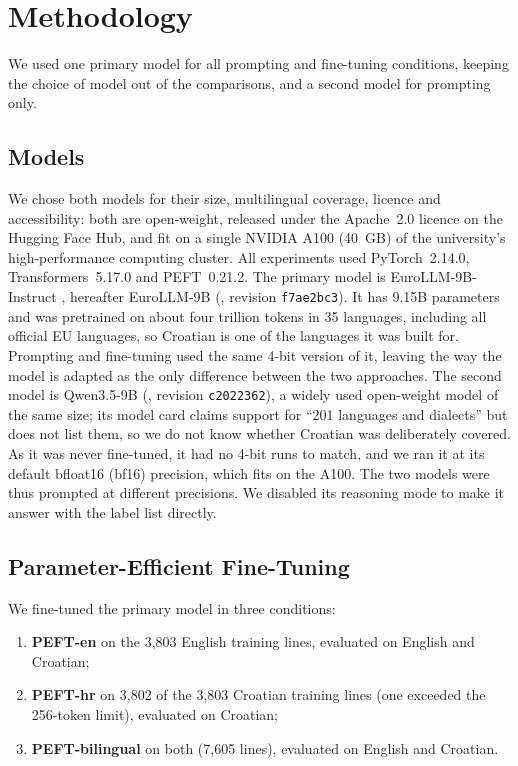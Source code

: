 \section{Methodology}
\label{sec:methodology}

We used one primary model for all prompting and fine-tuning conditions, keeping the choice of model out of the comparisons, and a second model for prompting only.

\subsection{Models}
\label{sec:methodology_models}

We chose both models for their size, multilingual coverage, licence and accessibility: both are open-weight, released under the Apache~2.0 licence on the Hugging Face Hub, and fit on a single NVIDIA A100 (40~GB) of the university's high-performance computing cluster. All experiments used PyTorch~2.14.0, Transformers~5.17.0 and PEFT~0.21.2. The primary model is EuroLLM-9B-Instruct \parencite{martins2025eurollm}, hereafter EuroLLM-9B (, revision \texttt{f7ae2bc3}). It has 9.15B parameters and was pretrained on about four trillion tokens in 35 languages, including all official EU languages, so Croatian is one of the languages it was built for. Prompting and fine-tuning used the same 4-bit version of it, leaving the way the model is adapted as the only difference between the two approaches. The second model is Qwen3.5-9B \parencite{qwen2026qwen35} (, revision \texttt{c2022362}), a widely used open-weight model of the same size; its model card claims support for ``201 languages and dialects'' but does not list them, so we do not know whether Croatian was deliberately covered. As it was never fine-tuned, it had no 4-bit runs to match, and we ran it at its default bfloat16 (bf16) precision, which fits on the A100. The two models were thus prompted at different precisions. We disabled its reasoning mode to make it answer with the label list directly.

\subsection{Parameter-Efficient Fine-Tuning}
\label{sec:methodology_peft}

We fine-tuned the primary model in three conditions:
\begin{enumerate}
    \item \textbf{PEFT-en} on the 3,803 English training lines, evaluated on English and Croatian;
    \item \textbf{PEFT-hr} on 3,802 of the 3,803 Croatian training lines (one exceeded the 256-token limit), evaluated on Croatian;
    \item \textbf{PEFT-bilingual} on both (7,605 lines), evaluated on English and Croatian.
\end{enumerate}

